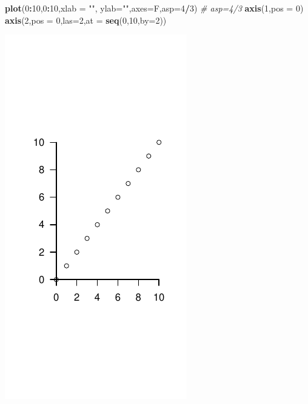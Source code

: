 \documentclass[
  11pt,
]{book}
\newenvironment{Shaded}{\begin{snugshade}}{\end{snugshade}}
\newcommand{\AttributeTok}[1]{\textcolor[rgb]{0.13,0.29,0.53}{#1}}
\newcommand{\CommentTok}[1]{\textcolor[rgb]{0.56,0.35,0.01}{\textit{#1}}}
\newcommand{\DecValTok}[1]{\textcolor[rgb]{0.00,0.00,0.81}{#1}}
\newcommand{\FunctionTok}[1]{\textcolor[rgb]{0.13,0.29,0.53}{\textbf{#1}}}
\newcommand{\NormalTok}[1]{#1}
\newcommand{\SpecialCharTok}[1]{\textcolor[rgb]{0.81,0.36,0.00}{\textbf{#1}}}
\newcommand{\StringTok}[1]{\textcolor[rgb]{0.31,0.60,0.02}{#1}}
\theoremstyle{mytheoremstyle}
\theoremstyle{mydefstyle}
\begin{document}
\begin{Shaded}
\begin{Highlighting}[]
\FunctionTok{plot}\NormalTok{(}\DecValTok{0}\SpecialCharTok{:}\DecValTok{10}\NormalTok{,}\DecValTok{0}\SpecialCharTok{:}\DecValTok{10}\NormalTok{,}\AttributeTok{xlab =} \StringTok{""}\NormalTok{, }\AttributeTok{ylab=}\StringTok{""}\NormalTok{,}\AttributeTok{axes=}\NormalTok{F,}\AttributeTok{asp=}\DecValTok{4}\SpecialCharTok{/}\DecValTok{3}\NormalTok{) }\CommentTok{\# asp=4/3 }
\FunctionTok{axis}\NormalTok{(}\DecValTok{1}\NormalTok{,}\AttributeTok{pos =} \DecValTok{0}\NormalTok{)}
\FunctionTok{axis}\NormalTok{(}\DecValTok{2}\NormalTok{,}\AttributeTok{pos =} \DecValTok{0}\NormalTok{,}\AttributeTok{las=}\DecValTok{2}\NormalTok{,}\AttributeTok{at =} \FunctionTok{seq}\NormalTok{(}\DecValTok{0}\NormalTok{,}\DecValTok{10}\NormalTok{,}\AttributeTok{by=}\DecValTok{2}\NormalTok{))}
\end{Highlighting}
\end{Shaded}

\begin{center}\includegraphics{Appunti_di_Statistica_2025_files/figure-latex/24-Libro-33-1} \end{center}
\end{document}
